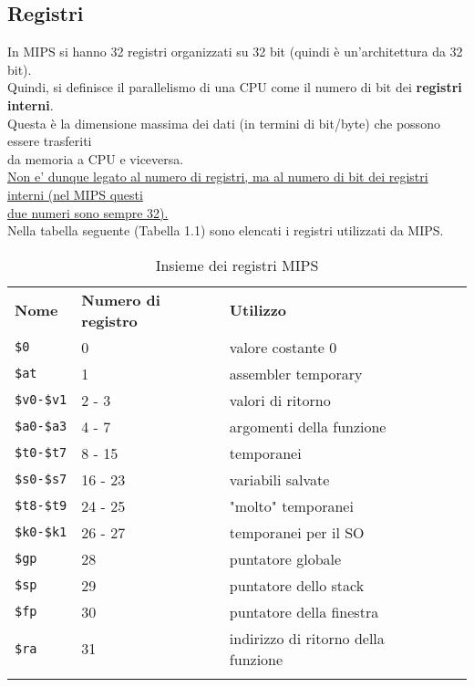 \documentclass[../main.tex]{subfiles}
\begin{document}
\subsection{Registri}
In MIPS si hanno 32 registri organizzati su 32 bit (quindi è
un'architettura da 32 bit). \\
Quindi, si definisce il parallelismo di una CPU come il numero di bit
dei \textbf{registri interni}. \\
Questa è la dimensione massima dei dati (in termini
di bit/byte) che possono essere trasferiti \\ da memoria
a CPU e viceversa.
\\[1mm]
\underline{Non e' dunque legato al numero di registri, ma al numero di bit dei
registri interni (nel MIPS questi} \\ \underline{due numeri sono sempre 32).}
\\[3mm]
Nella tabella seguente (Tabella 1.1) sono elencati i registri utilizzati da MIPS.
\begin{table}[htb!]
    \centering
    
    \setlength{\tabcolsep}{12pt}
    \renewcommand{\arraystretch}{1.5}
    \begin{tabular}{ V{4} p{2cm} | p{4cm} | p{5cm} V{4}}
        { \textbf{Nome} } & { \textbf{Numero di registro} } & { \textbf{Utilizzo} } \\
        \texttt{\$0} & 0 & valore costante 0 \\
        \hline
        \texttt{\$at} & 1 & assembler temporary \\
        \hline
        \texttt{\$v0-\$v1} & 2 - 3 & valori di ritorno \\
        \hline
        \texttt{\$a0-\$a3} & 4 - 7 & argomenti della funzione \\
        \hline
        \texttt{\$t0-\$t7} & 8 - 15 & temporanei \\
        \hline
        \texttt{\$s0-\$s7} & 16 - 23 & variabili salvate \\
        \hline
        \texttt{\$t8-\$t9} & 24 - 25 & "molto" temporanei \\
        \hline
        \texttt{\$k0-\$k1} & 26 - 27 & temporanei per il SO \\
        \hline
        \texttt{\$gp} & 28 & puntatore globale \\
        \hline
        \texttt{\$sp} & 29 & puntatore dello stack \\
        \hline
        \texttt{\$fp} & 30 & puntatore della finestra \\
        \hline
        \texttt{\$ra} & 31 & indirizzo di ritorno della funzione \\
    \end{tabular}
    \caption{Insieme dei registri MIPS}
\end{table}
\end{document}
